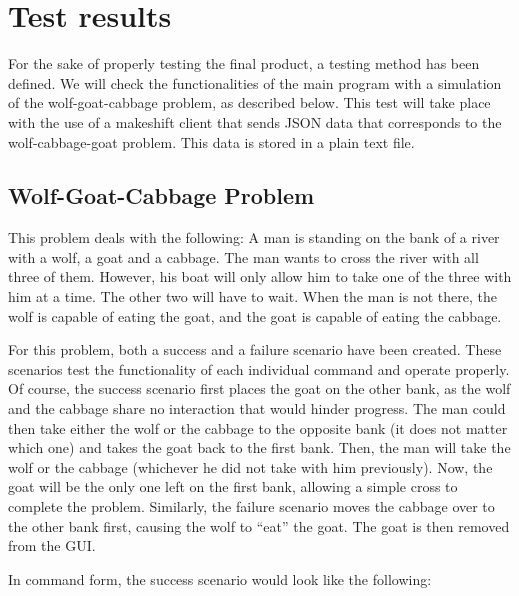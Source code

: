 \documentclass[11pt,a4paper]{article}
\begin{document}
\section{Test results}

For the sake of properly testing the final product, a testing method has been defined. We will check the functionalities of the main program with a simulation of the wolf-goat-cabbage problem, as described below. This test will take place with the use of a makeshift client that sends JSON data that corresponds to the wolf-cabbage-goat problem. This data is stored in a plain text file.

\subsection{Wolf-Goat-Cabbage Problem}

This problem deals with the following: A man is standing on the bank of a river with a wolf, a goat and a cabbage. The man wants to cross the river with all three of them. However, his boat will only allow him to take one of the three with him at a time. The other two will have to wait. When the man is not there, the wolf is capable of eating the goat, and the goat is capable of eating the cabbage.

For this problem, both a success and a failure scenario have been created. These scenarios test the functionality of each individual command and operate properly. Of course, the success scenario first places the goat on the other bank, as the wolf and the cabbage share no interaction that would hinder progress. The man could then take either the wolf or the cabbage to the opposite bank (it does not matter which one) and takes the goat back to the first bank. Then, the man will take the wolf or the cabbage (whichever he did not take with him previously). Now, the goat will be the only one left on the first bank, allowing a simple cross to complete the problem. Similarly, the failure scenario moves the cabbage over to the other bank first, causing the wolf to ``eat'' the goat. The goat is then removed from the GUI.

In command form, the success scenario would look like the following:
\end{document}

